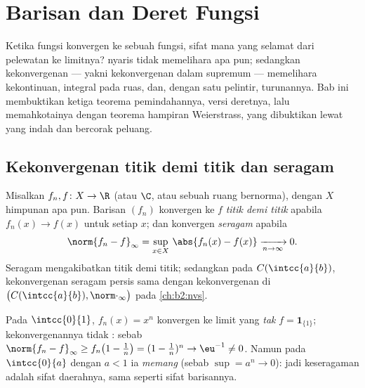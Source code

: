 \chapter{Barisan dan Deret Fungsi}\label{ch:b2:funcseq}

Ketika fungsi konvergen ke sebuah fungsi, sifat mana yang selamat dari
pelewatan ke limitnya?  nyaris tidak
memelihara apa pun; sedangkan kekonvergenan \emph{} --- yakni
kekonvergenan dalam  supremum --- memelihara kekontinuan, integral
pada ruas, dan, dengan satu pelintir, turunannya. Bab ini membuktikan
ketiga teorema pemindahannya, versi deretnya, lalu memahkotainya dengan
teorema hampiran Weierstrass, yang dibuktikan lewat 
yang indah dan bercorak peluang.

\section{Kekonvergenan titik demi titik dan seragam}

\begin{definition}\label{def:b2:funcseq:def}
Misalkan $f_n, f \colon X \to \R$ (atau $\C$, atau sebuah ruang
bernorma), dengan $X$ himpunan apa pun. Barisan $(f_n)$ konvergen ke $f$
\emph{titik demi titik}
apabila $f_n(x) \to f(x)$ untuk setiap $x$; dan konvergen
\emph{seragam} apabila
\[
\norm{f_n - f}_\infty = \sup_{x \in X}\, \abs{f_n(x) - f(x)}
\xrightarrow[n \to \infty]{} 0 .
\]
Seragam mengakibatkan titik demi titik; sedangkan pada
$C(\intcc{a}{b})$, kekonvergenan seragam persis sama dengan kekonvergenan
di  $\bigl(C(\intcc{a}{b}), \norm\cdot_\infty\bigr)$ pada
\cref{ch:b2:nvs}.
\end{definition}

\begin{example}\label{ex:b2:funcseq:xn}
Pada $\intcc{0}{1}$, $f_n(x) = x^n$ konvergen  ke limit
yang \emph{tak } $f = \mathbf{1}_{\{1\}}$; kekonvergenannya
tidak : sebab $\norm{f_n - f}_\infty \geq f_n\bigl(1 -
\tfrac1n\bigr) = (1 - \tfrac1n)^n \to \eu^{-1} \neq 0$. Namun pada
$\intcc{0}{a}$ dengan $a < 1$ ia \emph{memang}  (sebab $\sup = a^n
\to 0$): jadi keseragaman adalah sifat daerahnya, sama seperti sifat barisannya.
\end{example}

